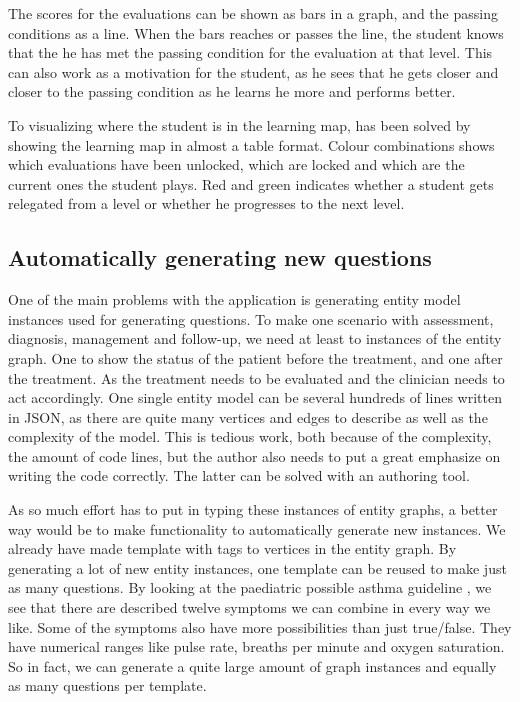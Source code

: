 The scores for the evaluations can be shown as bars in a graph, and the passing conditions as a line. When the bars reaches or passes the line, the student knows that the he has met the passing condition for the evaluation at that level. This can also work as a motivation for the student, as he sees that he gets closer and closer to the passing condition as he learns he more and performs better.

To visualizing where the student is in the learning map, has been solved by showing the learning map in almost a table format. Colour combinations shows which evaluations have been unlocked, which are locked and which are the current ones the student plays. Red and green indicates whether a student gets relegated from a level or whether he progresses to the next level.	



 
\subsection{Automatically generating new questions}
One of the main problems with the application is generating entity model instances used for generating questions. To make one scenario with assessment, diagnosis, management and follow-up, we need at least to instances of the entity graph. One to show the status of the patient before the treatment, and one after the treatment. As the treatment needs to be evaluated and the clinician needs to act accordingly. One single entity model can be several hundreds of lines written in JSON, as there are quite many vertices and edges to describe as well as the complexity of the model. This is tedious work, both because of the complexity, the amount of code lines, but the author also needs to put a great emphasize on writing the code correctly. The latter can be solved with an authoring tool.

As so much effort has to put in typing these instances of entity graphs, a better way would be to make functionality to automatically generate new instances. We already have made template with tags to vertices in the entity graph. By generating a lot of new entity instances, one template can be reused to make just as many questions. By looking at the paediatric possible asthma guideline \parencite{RepublicofKeny2016}, we see that there are described twelve symptoms we can combine in every way we like. Some of the symptoms also have more possibilities than just true/false. They have numerical ranges like pulse rate, breaths per minute and oxygen saturation. So in fact, we can generate a quite large amount of graph instances and equally as many questions per template.



